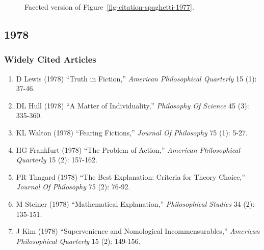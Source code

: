 \documentclass[
  10pt,
  letterpaper,
  DIV=11,
  numbers=noendperiod,
  twoside]{scrartcl}
\providecommand{\tightlist}{%
  \setlength{\itemsep}{0pt}\setlength{\parskip}{0pt}}\usepackage{longtable,booktabs,array}
\begin{document}
\begin{figure}


\caption{\label{fig-citation-facet-1977}Faceted version of
Figure~\ref{fig-citation-spaghetti-1977}.}

\end{figure}%

\newpage

\subsection{1978}\label{sec-s1978}

\subsubsection*{Widely Cited Articles}\label{widely-cited-articles-22}

\begin{enumerate}
\def\labelenumi{\arabic{enumi}.}
\tightlist
\item
  D Lewis (1978) ``Truth in Fiction,'' \emph{American Philosophical
  Quarterly} 15 (1): 37-46.
\item
  DL Hull (1978) ``A Matter of Individuality,'' \emph{Philosophy Of
  Science} 45 (3): 335-360.
\item
  KL Walton (1978) ``Fearing Fictions,'' \emph{Journal Of Philosophy} 75
  (1): 5-27.
\item
  HG Frankfurt (1978) ``The Problem of Action,'' \emph{American
  Philosophical Quarterly} 15 (2): 157-162.
\item
  PR Thagard (1978) ``The Best Explanation: Criteria for Theory
  Choice,'' \emph{Journal Of Philosophy} 75 (2): 76-92.
\item
  M Steiner (1978) ``Mathematical Explanation,'' \emph{Philosophical
  Studies} 34 (2): 135-151.
\item
  J Kim (1978) ``Supervenience and Nomological Incommensurables,''
  \emph{American Philosophical Quarterly} 15 (2): 149-156.
\end{enumerate}
\end{document}
